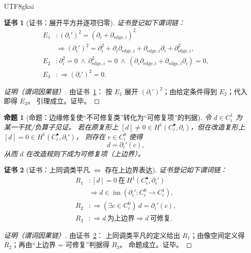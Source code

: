 \documentclass[12pt]{article}
\newtheorem{proposition}{命题}[section]
\newtheorem{Certificate}{证书}[section]
\begin{document}
\begin{CJK*}{UTF8}{gkai}
\begin{Certificate}[证书：展开平方并逐项归零]
\label{cert:edge-repair-yields-valid-differential}
证书登记如下谓词链：
\[
\begin{aligned}
  E_1 &: (\partial_i')^2=(\partial_i+\partial_{\mathrm{edge},i})^2\\
      &\Rightarrow (\partial_i')^2=\partial_i^2+\partial_i\partial_{\mathrm{edge},i}+\partial_{\mathrm{edge},i}
      \partial_i+\partial_{\mathrm{edge},i}^2,\\
  E_2 &: \partial_i^2=0\ \wedge\ \partial_{\mathrm{edge},i}^2=0\ \wedge\ (\partial_i\partial_{\mathrm{edge},i}
    +\partial_{\mathrm{edge},i}\partial_i)=0,\\
  E_3 &: \Rightarrow (\partial_i')^2=0.
\end{aligned}
\]
\end{Certificate}

\begin{proof}[证明（谓词因果链）]
由证书~\ref{cert:edge-repair-yields-valid-differential}：
按 $E_1$ 展开 $(\partial_i')^2$；由给定条件得到 $E_2$；代入即得 $E_3$。
引理成立。证毕。
\end{proof}

\begin{proposition}[命题：边缘修复使“不可修复类”转化为“可修复项”的判据]
\label{prop:edge-repair-trivializes-obstruction-class}
令 $d\in C_i^1$ 为某一干扰/负算子见证。
若在原复形上 $[d]\neq 0\in H^1(C_i^\bullet,\partial_i)$，但在改造复形上 $[d]=0\in H^1(C_i^\bullet,\partial_i')$，
则存在 $c\in C_i^0$ 使得
\[
  d=\partial_i'(c),
\]
从而 $d$ 在改造规则下成为可修复项（上边界）。
\end{proposition}

\begin{Certificate}[证书：上同调类平凡 $\Leftrightarrow$ 存在上边界表达]
\label{cert:edge-repair-trivializes-obstruction-class}
证书登记如下谓词链：
\[
\begin{aligned}
  R_1 &: [d]=0\ \text{在}\ H^1(C_i^\bullet,\partial_i')\\
      &\Rightarrow d\in \operatorname{im}(\partial_i':C_i^0\to C_i^1),\\
  R_2 &: \Rightarrow (\exists c\in C_i^0)\ d=\partial_i'(c),\\
  R_3 &: \Rightarrow d\ \text{为上边界}\Rightarrow d\ \text{可修复}.
\end{aligned}
\]
\end{Certificate}

\begin{proof}[证明（谓词因果链）]
由证书~\ref{cert:edge-repair-trivializes-obstruction-class}：
上同调类平凡的定义给出 $R_1$；由像空间定义得 $R_2$；再由“上边界 = 可修复”判据得 $R_3$。
命题成立。证毕。
\end{proof}


\end{CJK*}
\end{document}
